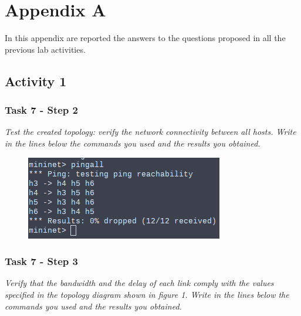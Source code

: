 \section*{Appendix A}

In this appendix are reported the answers to the questions proposed in all the
previous lab activities.


\subsection*{Activity 1}

\subsubsection*{Task 7 - Step 2}
\textit{Test the created topology: verify the network connectivity between all hosts.
Write in the lines below the commands you used and the results you obtained.}
\begin{figure}[htb]
	\centering
	\includegraphics[width=0.5\linewidth]{img/task-7-step-2.png}
\end{figure}



\subsubsection*{Task 7 - Step 3}
\textit{Verify that the bandwidth and the delay of each link comply with the values
specified in the topology diagram shown in figure 1. Write in the lines below
the commands you used and the results you obtained.}

